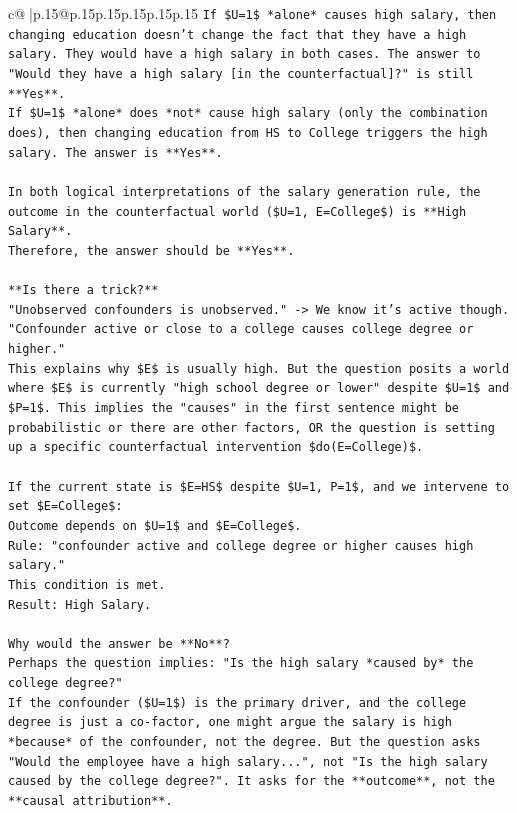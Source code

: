 \documentclass{article}
\begin{document}
{\begin{supertabular}{c@{$\;$}|p{.15\linewidth}@{}p{.15\linewidth}p{.15\linewidth}p{.15\linewidth}p{.15\linewidth}p{.15\linewidth}}
{{{\texttt{If \$U=1\$ *alone* causes high salary, then changing education doesn't change the fact that they have a high salary. They would have a high salary in both cases. The answer to "Would they have a high salary {[}in the counterfactual{]}?" is still **Yes**.} \\
\texttt{If \$U=1\$ *alone* does *not* cause high salary (only the combination does), then changing education from HS to College triggers the high salary. The answer is **Yes**.} \\
\\ 
\texttt{In both logical interpretations of the salary generation rule, the outcome in the counterfactual world (\$U=1, E=College\$) is **High Salary**.} \\
\texttt{Therefore, the answer should be **Yes**.} \\
\\ 
\texttt{**Is there a trick?**} \\
\texttt{"Unobserved confounders is unobserved." {-}> We know it's active though.} \\
\texttt{"Confounder active or close to a college causes college degree or higher."} \\
\texttt{This explains why \$E\$ is usually high. But the question posits a world where \$E\$ is currently "high school degree or lower" despite \$U=1\$ and \$P=1\$. This implies the "causes" in the first sentence might be probabilistic or there are other factors, OR the question is setting up a specific counterfactual intervention \$do(E=College)\$.} \\
\\ 
\texttt{If the current state is \$E=HS\$ despite \$U=1, P=1\$, and we intervene to set \$E=College\$:} \\
\texttt{Outcome depends on \$U=1\$ and \$E=College\$.} \\
\texttt{Rule: "confounder active and college degree or higher causes high salary."} \\
\texttt{This condition is met.} \\
\texttt{Result: High Salary.} \\
\\ 
\texttt{Why would the answer be **No**?} \\
\texttt{Perhaps the question implies: "Is the high salary *caused by* the college degree?"} \\
\texttt{If the confounder (\$U=1\$) is the primary driver, and the college degree is just a co{-}factor, one might argue the salary is high *because* of the confounder, not the degree. But the question asks "Would the employee have a high salary...", not "Is the high salary caused by the college degree?". It asks for the **outcome**, not the **causal attribution**.} \\
}}}
\end{supertabular}}
\end{document}
